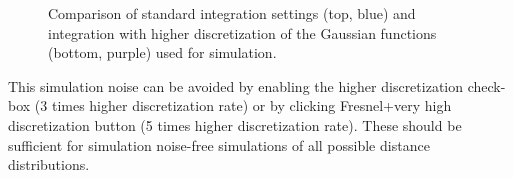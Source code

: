\documentclass[pdftex,bezier,german,a4,twoside, headexclude,12pt,nochapterprefix, titlepage]{extarticle}
\newcommand{\figspace}{\hspace{0.5cm}}
\begin{document}
\begin{figure}[!htb]
     \figspace
    \caption{Comparison of standard integration settings (top, blue) and integration with higher discretization of the Gaussian
    functions (bottom, purple) used for simulation.
    }
\label{Integration_mehtods_comparison}
\end{figure} 
This simulation noise  can be avoided by enabling the higher discretization check-box (3 times higher discretization rate) or by clicking 
Fresnel+very high discretization button (5 times higher discretization rate). These should be sufficient for simulation noise-free
simulations of all possible distance distributions.

\newpage
\end{document}
